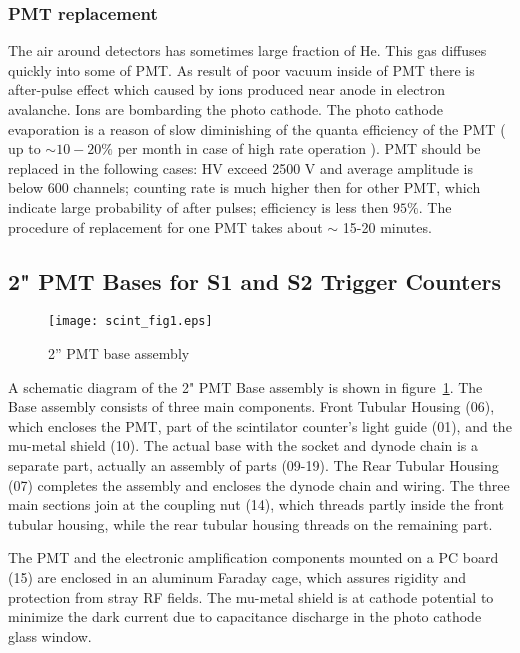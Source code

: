\documentclass[12pt]{article}
\begin{document}
\subsubsection{PMT replacement}
The air around detectors has sometimes large fraction of He. This gas diffuses quickly 
into some of PMT. As result of poor vacuum inside of PMT there is after-pulse effect
which caused by ions produced near anode in electron avalanche. Ions are bombarding the photo 
cathode. The photo cathode evaporation is a reason of slow diminishing of the quanta efficiency 
of the PMT ( up to $\sim 10-20 \%$ per month in case of high rate operation ). 
PMT should be replaced in the following cases:
HV exceed 2500 V and average amplitude is below 600 channels; counting rate is much higher then 
for other PMT, which indicate large probability of after pulses; efficiency is less then $95\%$.
The procedure of replacement for one PMT takes about $\sim$ 15-20 minutes.

\subsection{ 2" PMT Bases for S1 and S2 Trigger Counters}

\begin{figure}
\begin{center}
\texttt{[image: scint\_fig1.eps]}
{\linespread{1.}
\caption[The 2" PMT base assembly used in S1 and S2 trigger scintillators]{2'' PMT base assembly}
\label{2''_PMT_base_assembly}}
\end{center}
\end{figure}

A schematic diagram of the 2" PMT Base assembly is shown in figure~\ref{2''_PMT_base_assembly}. 
The Base assembly consists of three main components. 
Front Tubular Housing (06), which encloses the PMT, part of the scintilator 
counter's light guide (01), and the mu-metal shield (10). The actual base with 
the socket and dynode chain is a separate part, actually an assembly of parts 
(09-19). The Rear Tubular Housing (07) completes the assembly and encloses the 
dynode chain and wiring. The three main sections join at the coupling nut (14), 
which threads partly inside the front tubular housing, while the rear tubular 
housing threads on the remaining part.

The PMT and the electronic amplification components mounted on a PC board 
(15) are enclosed in an aluminum Faraday cage, which assures rigidity and 
protection from stray RF fields. The mu-metal shield is at cathode potential to 
minimize the dark current due to capacitance discharge in the photo cathode 
glass window.
\end{document}
